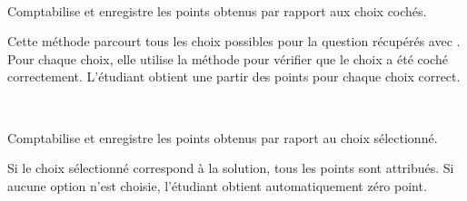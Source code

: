 \documentclass[a4,10pt,french]{sphinxmanual}
\begin{document}
\begin{fulllineitems}
\label{source:quiz.models.QcmSubmitMulti}~

\begin{fulllineitems}
\label{source:quiz.models.QcmSubmitMulti.save_result}
Comptabilise et enregistre les points obtenus par rapport aux choix cochés.

Cette méthode parcourt tous les choix possibles pour la question
 récupérés avec . Pour chaque
choix, elle utilise la méthode {\hyperref[source:quiz.models.QcmChoice.correct_submit]{\emph{}}} pour
vérifier que le choix a été coché correctement. L'étudiant obtient une partir
des points pour chaque choix correct.

\end{fulllineitems}


\end{fulllineitems}


\begin{fulllineitems}
\label{source:quiz.models.QcmSubmitOne}~

\begin{fulllineitems}
\label{source:quiz.models.QcmSubmitOne.save_result}
Comptabilise et enregistre les points obtenus par raport au choix sélectionné.

Si le choix sélectionné correspond à la solution, tous les points sont attribués.
Si aucune option n'est choisie, l'étudiant obtient automatiquement zéro point.

\end{fulllineitems}


\end{fulllineitems}

\end{document}
